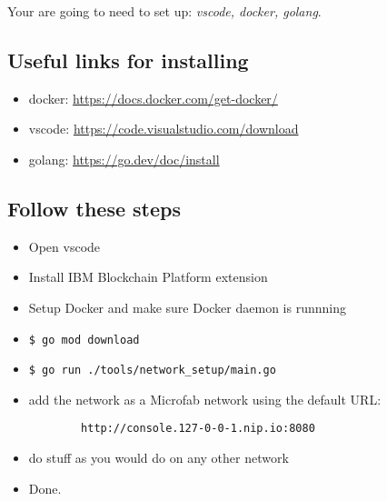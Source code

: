 Your are going to need to set up: \emph{vscode, docker, golang}.
\subsection{Useful links for installing}
\begin{itemize}
    \item docker: \href{https://docs.docker.com/get-docker/}{https://docs.docker.com/get-docker/}
    \item vscode: \href{https://code.visualstudio.com/download}{https://code.visualstudio.com/download}
    \item golang: \href{https://go.dev/doc/install}{https://go.dev/doc/install}
\end{itemize}
\subsection{Follow these steps}
\begin{itemize}
    \item Open vscode
    \item Install IBM Blockchain Platform extension
    \item Setup Docker and make sure Docker daemon is runnning
    \item \begin{verbatim}$ go mod download\end{verbatim}
    \item \begin{verbatim}$ go run ./tools/network_setup/main.go\end{verbatim}
    \item add the network as a Microfab network using the default URL: \begin{verbatim}
        http://console.127-0-0-1.nip.io:8080
    \end{verbatim}
    \item do stuff as you would do on any other network
    \item Done.
\end{itemize}
